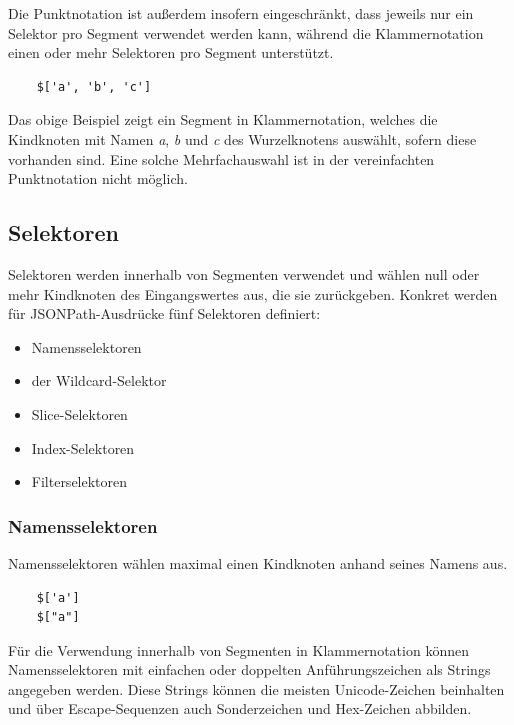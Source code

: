 \documentclass[oneside]{ausarbeitung}
\begin{document}
Die Punktnotation ist außerdem insofern eingeschränkt, dass jeweils nur ein Selektor pro Segment verwendet werden kann, während die Klammernotation einen oder mehr Selektoren pro Segment unterstützt.
	
\begin{lstlisting}
	$['a', 'b', 'c']
\end{lstlisting}
	
Das obige Beispiel zeigt ein Segment in Klammernotation, welches die Kindknoten mit Namen \textit{a}, \textit{b} und \textit{c} des Wurzelknotens auswählt, sofern diese vorhanden sind. Eine solche Mehrfachauswahl ist in der vereinfachten Punktnotation nicht möglich.
	
	

\pagebreak

\subsection{Selektoren}
	
Selektoren werden innerhalb von Segmenten verwendet und wählen null oder mehr Kindknoten des Eingangswertes aus, die sie zurückgeben. Konkret werden für JSONPath-Ausdrücke fünf Selektoren definiert:
	
\begin{itemize}
	\item Namensselektoren
	\item der Wildcard-Selektor
	\item Slice-Selektoren
	\item Index-Selektoren
	\item Filterselektoren
\end{itemize}
	
	
	
\subsubsection{Namensselektoren}
	
Namensselektoren wählen maximal einen Kindknoten anhand seines Namens aus. 
	
\begin{lstlisting}
	$['a']
	$["a"]
\end{lstlisting}
	
Für die Verwendung innerhalb von Segmenten in Klammernotation können Namensselektoren mit einfachen oder doppelten Anführungszeichen als Strings angegeben werden. Diese Strings können die meisten Unicode-Zeichen beinhalten und über Escape-Sequenzen auch Sonderzeichen und Hex-Zeichen abbilden. 
	
\end{document}
